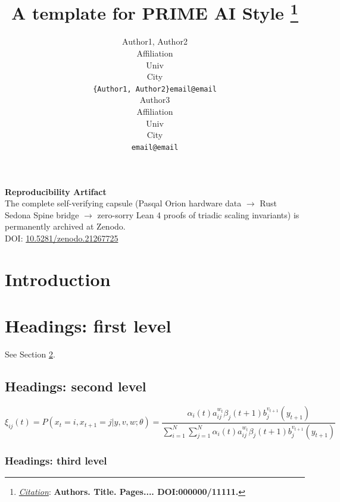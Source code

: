 \documentclass{article}
\title{A template for PRIME AI Style
\thanks{\textit{\underline{Citation}}: 
\textbf{Authors. Title. Pages.... DOI:000000/11111.}} 
}
\author{
  Author1, Author2 \\
  Affiliation \\
  Univ \\
  City\\
  \texttt{\{Author1, Author2\}email@email} \\
   \And
  Author3 \\
  Affiliation \\
  Univ \\
  City\\
  \texttt{email@email} \\
}
\begin{document}
\maketitle

\vspace{0.6cm}
\begin{center}
\textbf{Reproducibility Artifact} \\
The complete self-verifying capsule (Pasqal Orion hardware data $\to$ Rust Sedona Spine bridge $\to$ zero-sorry Lean 4 proofs of triadic scaling invariants) is permanently archived at Zenodo. \\
\vspace{0.2cm}
DOI: \href{https://doi.org/10.5281/zenodo.21267725}{10.5281/zenodo.21267725}
\end{center}
\vspace{0.4cm}

\begin{abstract}
\lipsum[1]
\end{abstract}




\section{Introduction}
\lipsum[2]
\lipsum[3]


\section{Headings: first level}
\label{sec:headings}

\lipsum[4] See Section \ref{sec:headings}.

\subsection{Headings: second level}
\lipsum[5]
\begin{equation}
\xi _{ij}(t)=P(x_{t}=i,x_{t+1}=j|y,v,w;\theta)= {\frac {\alpha _{i}(t)a^{w_t}_{ij}\beta _{j}(t+1)b^{v_{t+1}}_{j}(y_{t+1})}{\sum _{i=1}^{N} \sum _{j=1}^{N} \alpha _{i}(t)a^{w_t}_{ij}\beta _{j}(t+1)b^{v_{t+1}}_{j}(y_{t+1})}}
\end{equation}

\subsubsection{Headings: third level}
\lipsum[6]
\end{document}
